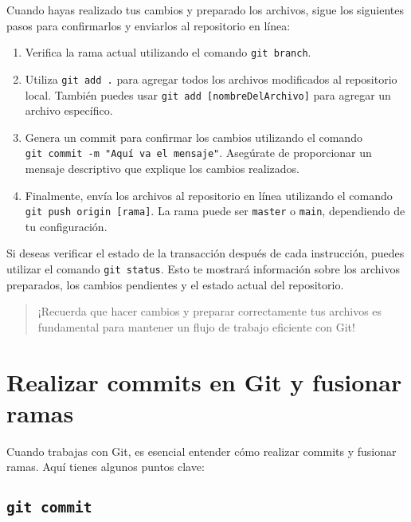 \documentclass[
  letterpaper,
  DIV=11,
  numbers=noendperiod]{scrartcl}
\providecommand{\tightlist}{%
  \setlength{\itemsep}{0pt}\setlength{\parskip}{0pt}}\usepackage{longtable,booktabs,array}
\begin{document}
Cuando hayas realizado tus cambios y preparado los archivos, sigue los
siguientes pasos para confirmarlos y enviarlos al repositorio en línea:

\begin{enumerate}
\def\labelenumi{\arabic{enumi}.}
\tightlist
\item
  Verifica la rama actual utilizando el comando \texttt{git\ branch}.
\item
  Utiliza \texttt{git\ add\ .} para agregar todos los archivos
  modificados al repositorio local. También puedes usar
  \texttt{git\ add\ {[}nombreDelArchivo{]}} para agregar un archivo
  específico.
\item
  Genera un commit para confirmar los cambios utilizando el comando
  \texttt{git\ commit\ -m\ "Aquí\ va\ el\ mensaje"}. Asegúrate de
  proporcionar un mensaje descriptivo que explique los cambios
  realizados.
\item
  Finalmente, envía los archivos al repositorio en línea utilizando el
  comando \texttt{git\ push\ origin\ {[}rama{]}}. La rama puede ser
  \texttt{master} o \texttt{main}, dependiendo de tu configuración.
\end{enumerate}

Si deseas verificar el estado de la transacción después de cada
instrucción, puedes utilizar el comando \texttt{git\ status}. Esto te
mostrará información sobre los archivos preparados, los cambios
pendientes y el estado actual del repositorio.

\begin{quote}
¡Recuerda que hacer cambios y preparar correctamente tus archivos es
fundamental para mantener un flujo de trabajo eficiente con Git!
\end{quote}

\hypertarget{realizar-commits-en-git-y-fusionar-ramas}{%
\section{Realizar commits en Git y fusionar
ramas}\label{realizar-commits-en-git-y-fusionar-ramas}}

Cuando trabajas con Git, es esencial entender cómo realizar commits y
fusionar ramas. Aquí tienes algunos puntos clave:

\hypertarget{git-commit}{%
\subsection{\texorpdfstring{\texttt{git\ commit}}{git commit}}\label{git-commit}}
\end{document}
